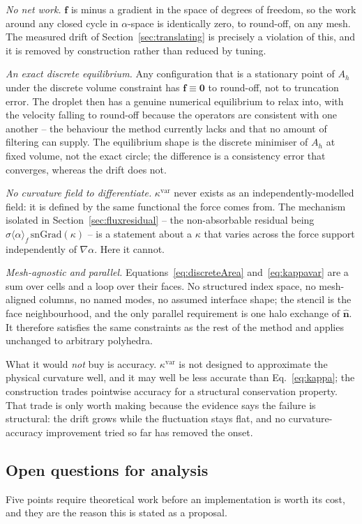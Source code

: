 \documentclass[preprint,3p,11pt]{elsarticle}
\begin{document}
\emph{No net work.} $\mathbf f$ is minus a gradient in the space of degrees of freedom, so
the work around any closed cycle in $\alpha$-space is identically zero, to round-off, on any
mesh. The measured drift of Section~\ref{sec:translating} is precisely a violation of this,
and it is removed by construction rather than reduced by tuning.

\emph{An exact discrete equilibrium.} Any configuration that is a stationary point of $A_h$
under the discrete volume constraint has $\mathbf f\equiv\mathbf 0$ to round-off, not to
truncation error. The droplet then has a genuine numerical equilibrium to relax into, with
the velocity falling to round-off because the operators are consistent with one another --
the behaviour the method currently lacks and that no amount of filtering can supply. The
equilibrium shape is the discrete minimiser of $A_h$ at fixed volume, not the exact circle;
the difference is a consistency error that converges, whereas the drift does not.

\emph{No curvature field to differentiate.} $\kappa^{\mathrm{var}}$ never exists as an
independently-modelled field: it is defined by the same functional the force comes from. The
mechanism isolated in Section~\ref{sec:fluxresidual} -- the non-absorbable residual being
$\sigma\langle\alpha\rangle_f\,\mathrm{snGrad}(\kappa)$ -- is a statement about a $\kappa$
that varies across the force support independently of $\nabla\alpha$. Here it cannot.

\emph{Mesh-agnostic and parallel.} Equations~\eqref{eq:discreteArea}
and~\eqref{eq:kappavar} are a sum over cells and a loop over their faces. No structured
index space, no mesh-aligned columns, no named modes, no assumed interface shape; the
stencil is the face neighbourhood, and the only parallel requirement is one halo exchange of
$\hat{\mathbf n}$. It therefore satisfies the same constraints as the rest of the method and
applies unchanged to arbitrary polyhedra.

What it would \emph{not} buy is accuracy. $\kappa^{\mathrm{var}}$ is not designed to
approximate the physical curvature well, and it may well be less accurate than
Eq.~\eqref{eq:kappa}; the construction trades pointwise accuracy for a structural
conservation property. That trade is only worth making because the evidence says the
failure is structural: the drift grows while the fluctuation stays flat, and no
curvature-accuracy improvement tried so far has removed the onset.

\subsection{Open questions for analysis}
Five points require theoretical work before an implementation is worth its cost, and they
are the reason this is stated as a proposal.
\end{document}
